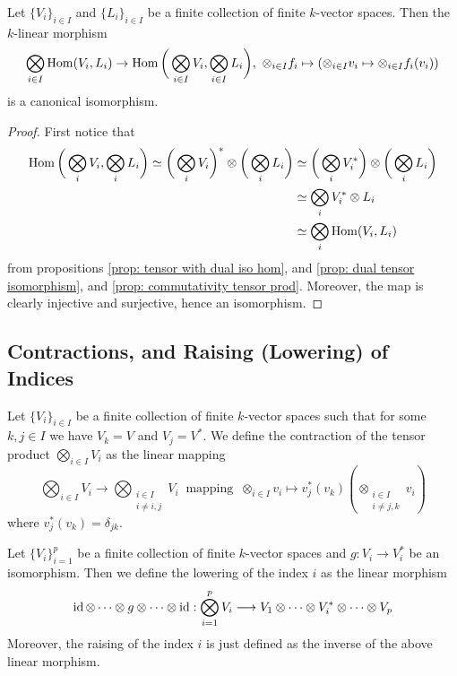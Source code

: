 \begin{corollary}
  Let \(\{V_i\}_{i \in I}\) and \(\{L_i\}_{i \in I}\) be a finite collection of
  finite \(k\)-vector spaces. Then the \(k\)-linear morphism
  \[
    \bigotimes_{i \in I} \operatorname{Hom}(V_i, L_i) \to
    \operatorname{Hom}\bigg( \bigotimes_{i \in I} V_i, \bigotimes_{i \in I} L_i \bigg),\
    \otimes_{i \in I} f_i \mapsto (\otimes_{i \in I} v_i \mapsto \otimes_{i \in
    I} f_i(v_i))
  \]
  is a canonical isomorphism.
\end{corollary}

\begin{proof}
  First notice that
  \begin{align*}
    \operatorname{Hom}\bigg( \bigotimes_i V_i, \bigotimes_i L_i \bigg)
    \simeq \bigg(\bigotimes_i V_i \bigg)^* \otimes \bigg( \bigotimes_i L_i \bigg)
    &\simeq \bigg( \bigotimes_i V_i^* \bigg)
    \otimes \bigg( \bigotimes_i L_i \bigg) \\
    &\simeq \bigotimes_i V_i^* \otimes L_i \\
    &\simeq \bigotimes_i \operatorname{Hom}(V_i, L_i)
  \end{align*}
  from propositions \ref{prop: tensor with dual iso hom}, and \ref{prop: dual
  tensor isomorphism}, and \ref{prop: commutativity tensor prod}. Moreover,
  the map is clearly injective and surjective, hence an isomorphism.
\end{proof}

\subsection{Contractions, and Raising (Lowering) of Indices}

\begin{definition}[Contraction]
  Let \(\{V_i\}_{i \in I}\) be a finite collection of finite \(k\)-vector spaces
  such that for some \(k, j \in I\) we have \(V_k = V\) and \(V_j = V^*\). We
  define the contraction of the tensor product \(\bigotimes_{i \in I} V_i\) as
  the linear mapping
  \[
    \bigotimes_{i \in I} V_i \longrightarrow \bigotimes_{\substack{i \in I \\ i
    \neq i, j}} V_i\ \text{ mapping }\
    \otimes_{i \in I} v_i \longmapsto
    v_j^*(v_k) (\otimes_{\substack{i \in I\\ i \neq j, k}} v_i)
  \]
  where \(v_j^*(v_k) = \delta_{jk}\).
\end{definition}

\begin{definition}
  Let \(\{V_i\}_{i=1}^p\) be a finite collection of finite \(k\)-vector spaces
  and \(g: V_i \to V_i^*\) be an isomorphism. Then we define the lowering of the
  index \(i\) as the linear morphism
  \[
    \operatorname{id} \otimes \dots \otimes g \otimes \dots \otimes \operatorname{id}:
    \bigotimes_{i=1}^p V_i \longrightarrow
    V_1 \otimes \dots \otimes V_i^* \otimes \dots \otimes V_p
  \]
  Moreover, the raising of the index \(i\) is just defined as the inverse of the
  above linear morphism.
\end{definition}

